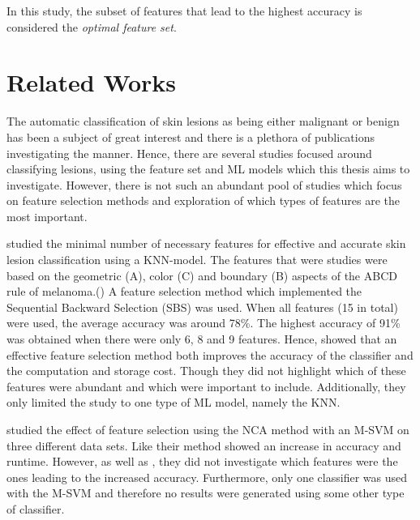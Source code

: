 \documentclass{kththesis}
\begin{document}
In this study, the subset of features that lead to the highest accuracy is considered the \emph{optimal feature set}.


\section{Related Works}


The automatic classification of skin lesions as being either malignant or benign has been a subject of great interest and there is a plethora of publications investigating the manner. Hence, there are several studies focused around classifying lesions, using the feature set and ML models which this thesis aims to investigate. However, there is not such an abundant pool of studies which focus on feature selection methods and exploration of which types of features are the most important. 

\parencite{MustafaSuleiman2017Fsus} studied the minimal number of necessary features for effective and accurate skin lesion classification using a KNN-model.  The features that were studies were based on the geometric (A), color (C)  and boundary (B) aspects of the ABCD rule of melanoma.(\parencite{MustafaSuleiman2017Fsus}) A feature selection method which implemented the Sequential Backward Selection (SBS) was used. When all features (15 in total) were used, the average accuracy was around 78\%. The highest accuracy of 91\% was obtained when there were only 6, 8 and 9 features. Hence, \parencite{MustafaSuleiman2017Fsus} showed that an effective feature selection method both improves the accuracy of the classifier and the computation and storage cost. Though they did not highlight which of these features were abundant and which were important to include. Additionally, they only limited the study to one type of ML model, namely the KNN. 

\parencite{MustafaSuleiman2017Fsus} studied the effect of feature selection using the NCA method with an M-SVM on three different data sets. Like \parencite{MustafaSuleiman2017Fsus} their method showed an increase in accuracy and runtime. However, as well as \parencite{MustafaSuleiman2017Fsus}, they did not investigate which features were the ones leading to the increased accuracy. Furthermore, only one classifier was used with the M-SVM and therefore no results were generated using some other type of classifier.
\end{document}
